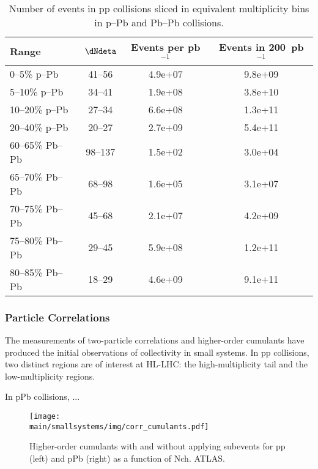\documentclass[../report.tex]{subfiles}
\providecommand{\main}{..}
\begin{document}
\begin{table}
\centering
\begin{tabular}{l|c|c|c}
Range & $\dNdeta$ & Events per pb$^{-1}$ & Events in 200~pb$^{-1}$ \\
\hline
0--5\% p--Pb   & 41--56        & 4.9e+07       & 9.8e+09 \\
5--10\% p--Pb  & 34--41        & 1.9e+08       & 3.8e+10 \\
10--20\% p--Pb & 27--34        & 6.6e+08       & 1.3e+11 \\
20--40\% p--Pb & 20--27        & 2.7e+09       & 5.4e+11 \\
\hline
60--65\% Pb--Pb    & 98--137       & 1.5e+02       & 3.0e+04 \\
65--70\% Pb--Pb    & 68--98        & 1.6e+05       & 3.1e+07 \\ 
70--75\% Pb--Pb    & 45--68        & 2.1e+07       & 4.2e+09 \\
75--80\% Pb--Pb    & 29--45        & 5.9e+08       & 1.2e+11 \\
80--85\% Pb--Pb    & 18--29        & 4.6e+09       & 9.1e+11 \\
\hline
\end{tabular}
\caption{Number of events in pp collisions sliced in equivalent multiplicity bins in p--Pb and Pb--Pb collisions.}
\end{table}



\subsubsection{Particle Correlations}

The measurements of two-particle correlations and higher-order cumulants have produced the initial observations of collectivity in small systems. In pp collisions, two distinct regions are of interest at HL-LHC: the high-multiplicity tail and the low-multiplicity regions. 

In pPb collisions, ...

\begin{figure}[ht]
\centering
\texttt{[image: \\main/smallsystems/img/corr\_cumulants.pdf]}

\caption{Higher-order cumulants with and without applying subevents for pp (left) and pPb (right) as a function of Nch. ATLAS.}
\label{fig:smallsystems_corr_cumulants}
\end{figure}
\end{document}
